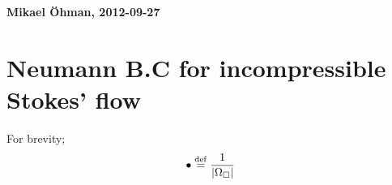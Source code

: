 \documentclass[a4paper]{article}
\newcommand{\surf}{\mathrm{s}}
\newcommand{\pore}{\mathrm{pore}}
\newcommand{\particle}{\mathrm{part}}
\begin{document}
\textbf{Mikael Öhman, 2012-09-27}
\section*{Neumann B.C for incompressible Stokes' flow}
For brevity;
\begin{gather}
 \bullet \overset{\mathrm{def}}{=} \frac{1}{|\Omega_\Box|}
\end{gather}
%
% 
% 
\end{document}
